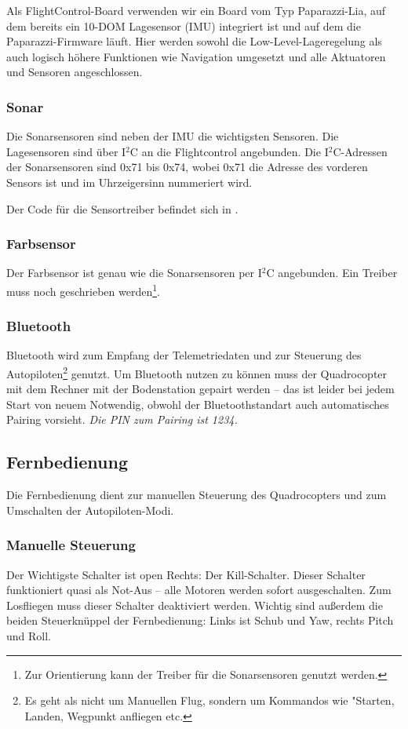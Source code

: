 Als FlightControl-Board verwenden wir ein Board vom Typ Paparazzi-Lia, auf dem bereits ein 10-DOM Lagesensor (IMU) integriert ist und auf dem die Paparazzi-Firmware läuft. Hier werden sowohl die Low-Level-Lageregelung als auch logisch höhere Funktionen wie Navigation umgesetzt und alle Aktuatoren und Sensoren angeschlossen.

\subsubsection{Sonar}
Die Sonarsensoren sind neben der IMU die wichtigsten Sensoren. Die Lagesensoren sind über I$^2$C an die Flightcontrol angebunden.
Die I$^2$C-Adressen der Sonarsensoren sind 0x71 bis 0x74, wobei 0x71 die Adresse des vorderen Sensors ist und im Uhrzeigersinn nummeriert wird.

Der Code für die Sensortreiber befindet sich in .

\subsubsection{Farbsensor}
Der Farbsensor ist genau wie die Sonarsensoren per I$^2$C angebunden. Ein Treiber muss noch geschrieben werden\footnote{Zur Orientierung kann der Treiber für die Sonarsensoren genutzt werden.}.


\subsubsection{Bluetooth}
Bluetooth wird zum Empfang der Telemetriedaten und zur Steuerung des Autopiloten\footnote{Es geht als nicht um Manuellen Flug, sondern um Kommandos wie "Starten, Landen, Wegpunkt anfliegen etc.} genutzt.
Um Bluetooth nutzen zu können muss der Quadrocopter mit dem Rechner mit der Bodenstation gepairt werden – das ist leider bei jedem Start von neuem Notwendig, obwohl der Bluetoothstandart auch automatisches Pairing vorsieht.
\emph{Die PIN zum Pairing ist 1234.}


\subsection{Fernbedienung}
Die Fernbedienung dient zur manuellen Steuerung des Quadrocopters und zum Umschalten der Autopiloten-Modi.

\subsubsection{Manuelle Steuerung}
Der Wichtigste Schalter ist open Rechts: Der Kill-Schalter. Dieser Schalter funktioniert quasi als Not-Aus – alle Motoren werden sofort ausgeschalten.
Zum Losfliegen muss dieser Schalter deaktiviert werden.
Wichtig sind außerdem die beiden Steuerknüppel der Fernbedienung: Links ist Schub und Yaw, rechts Pitch und Roll.

